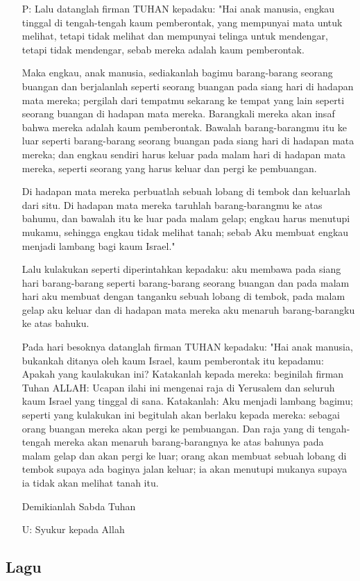 \documentclass[a4paper,12pt]{article}
\newcommand{\BU}[1]{\begin{itemize} \item[U:] #1 \end{itemize}}
\newcommand{\BP}[1]{\begin{itemize} \item[P:] #1 \end{itemize}}
\begin{document}
\BP{Lalu datanglah firman TUHAN kepadaku:
"Hai anak manusia, engkau tinggal di tengah-tengah kaum pemberontak, yang mempunyai mata untuk melihat, tetapi tidak melihat dan mempunyai telinga untuk mendengar, tetapi tidak mendengar, sebab mereka adalah kaum pemberontak.

Maka engkau, anak manusia, sediakanlah bagimu barang-barang seorang buangan dan berjalanlah seperti seorang buangan pada siang hari di hadapan mata mereka; pergilah dari tempatmu sekarang ke tempat yang lain seperti seorang buangan di hadapan mata mereka. Barangkali mereka akan insaf bahwa mereka adalah kaum pemberontak.
Bawalah barang-barangmu itu ke luar seperti barang-barang seorang buangan pada siang hari di hadapan mata mereka; dan engkau sendiri harus keluar pada malam hari di hadapan mata mereka, seperti seorang yang harus keluar dan pergi ke pembuangan.

Di hadapan mata mereka perbuatlah sebuah lobang di tembok dan keluarlah dari situ.
Di hadapan mata mereka taruhlah barang-barangmu ke atas bahumu, dan bawalah itu ke luar pada malam gelap; engkau harus menutupi mukamu, sehingga engkau tidak melihat tanah; sebab Aku membuat engkau menjadi lambang bagi kaum Israel."

Lalu kulakukan seperti diperintahkan kepadaku: aku membawa pada siang hari barang-barang seperti barang-barang seorang buangan dan pada malam hari aku membuat dengan tanganku sebuah lobang di tembok, pada malam gelap aku keluar dan di hadapan mata mereka aku menaruh barang-barangku ke atas bahuku.

Pada hari besoknya datanglah firman TUHAN kepadaku:
"Hai anak manusia, bukankah ditanya oleh kaum Israel, kaum pemberontak itu kepadamu: Apakah yang kaulakukan ini?
Katakanlah kepada mereka: beginilah firman Tuhan ALLAH: Ucapan ilahi ini mengenai raja di Yerusalem dan seluruh kaum Israel yang tinggal di sana.
Katakanlah: Aku menjadi lambang bagimu; seperti yang kulakukan ini begitulah akan berlaku kepada mereka: sebagai orang buangan mereka akan pergi ke pembuangan.
Dan raja yang di tengah-tengah mereka akan menaruh barang-barangnya ke atas bahunya pada malam gelap dan akan pergi ke luar; orang akan membuat sebuah lobang di tembok supaya ada baginya jalan keluar; ia akan menutupi mukanya supaya ia tidak akan melihat tanah itu.

Demikianlah Sabda Tuhan
}

\BU{Syukur kepada Allah}
\subsection*{Lagu}
\end{document}
